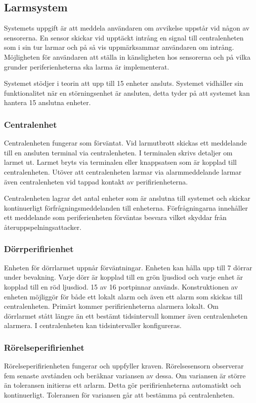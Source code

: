 \documentclass[a4paper]{article}
\newcommand{\todo}[1]{\marginpar{TODO: #1}\vspace{1cm}}
\begin{document}
\subsection{Larmsystem}
Systemets uppgift är att meddela användaren om avvikelse uppstår vid någon av sensorerna. En sensor skickar vid upptäckt intrång en signal till centralenheten som i sin tur larmar och på så vis uppmärksammar användaren om intrång. Möjligheten för användaren att ställa in känsligheten hos sensorerna och på vilka grunder periferienheterna ska larma är implementerat.

Systemet stödjer i teorin att upp till 15 enheter ansluts. Systemet vidhåller sin funktionalitet när en störningsenhet är ansluten, detta tyder på att systemet kan hantera 15 anslutna enheter.

\subsubsection{Centralenhet}
Centralenheten fungerar som förväntat. Vid larmutbrott skickas ett meddelande till en ansluten terminal via centralenheten. I terminalen skrivs detaljer om larmet ut. Larmet bryts via terminalen eller knappsatsen som är kopplad till centralenheten. Utöver att centralenheten larmar via alarmmeddelande larmar även centralenheten vid tappad kontakt av perifirienheterna.

Centralenheten lagrar det antal enheter som är anslutna till systemet och skickar kontinuerligt förfrågningsmeddelanden till enheterna. Förfrågningarna innehåller ett meddelande som periferienheten förväntas besvara vilket skyddar från återuppspelningsattacker.

\subsubsection{Dörrperifirienhet}
\todo{Motivera varför 7 dörrar används}
Enheten för dörrlarmet uppnår förväntningar. Enheten kan hålla upp till 7 dörrar under bevakning. Varje dörr är kopplad till en grön ljusdiod och varje enhet är kopplad till en röd ljusdiod. 15 av 16 portpinnar används. Konstruktionen av enheten möjliggör för både ett lokalt alarm och även ett alarm som skickas till centralenheten. Primärt kommer perifirienheterna alarmera lokalt. Om dörrlarmet stått längre än ett bestämt tidsintervall kommer även centralenheten alarmera. I centralenheten kan tidsintervaller konfigureras.

\subsubsection{Rörelseperifirienhet}
Rörelseperifirienheten fungerar och uppfyller kraven. Rörelsesensorn observerar fem senaste avstånden och beräknar variansen av dessa. Om variansen är större än toleransen initieras ett arlarm. Detta gör perifirienheterna automatiskt och kontinuerligt. Toleransen för variansen går att bestämma på centralenheten.
\end{document}
